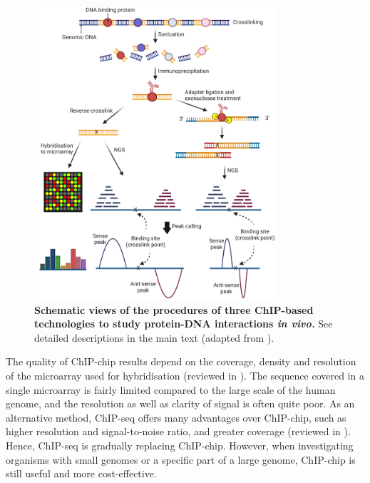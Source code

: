 \begin{figure}[h]
    \centering
    \includegraphics[width=0.8\textwidth]{chapter1/figures/fig8.pdf}
    \caption[Schematic views of the procedures of three ChIP-based technologies to study protein-DNA interactions \textit{in vivo}]{\textbf{Schematic views of the procedures of three ChIP-based technologies to study protein-DNA interactions \textit{in vivo.}} See detailed descriptions in the main text (adapted from \cite{visel2009genomic,rhee2011comprehensive}).}
    \label{fig:fig8}
\end{figure}

The quality of ChIP-chip results depend on the coverage, density and resolution of the microarray used for hybridisation (reviewed in \cite{hudson2006high-throughput}). The sequence covered in a single microarray is fairly limited compared to the large scale of the human genome, and the resolution as well as clarity of signal is often quite poor. As an alternative method, ChIP-seq offers many advantages over ChIP-chip, such as higher resolution and signal-to-noise ratio, and greater coverage (reviewed in \cite{park2009chip-seq:}). Hence, ChIP-seq is gradually replacing ChIP-chip. However, when investigating organisms with small genomes or a specific part of a large genome, ChIP-chip is still useful and more cost-effective.

